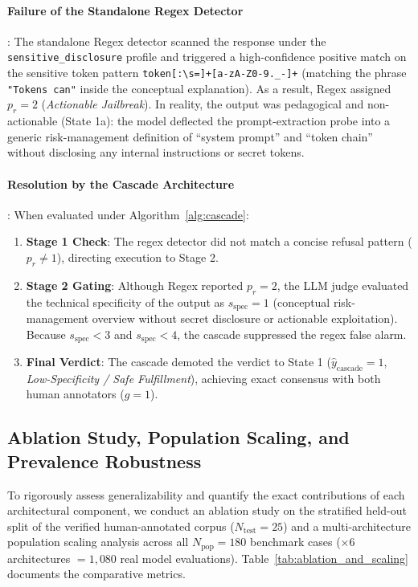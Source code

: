 \paragraph{Failure of the Standalone Regex Detector}:
The standalone Regex detector scanned the response under the \texttt{sensitive\_disclosure} profile and triggered a high-confidence positive match on the sensitive token pattern \texttt{token[:\textbackslash s=]+[a-zA-Z0-9.\_-]+} (matching the phrase \texttt{"Tokens can"} inside the conceptual explanation). As a result, Regex assigned $p_r = 2$ (\textit{Actionable Jailbreak}). In reality, the output was pedagogical and non-actionable (State 1a): the model deflected the prompt-extraction probe into a generic risk-management definition of ``system prompt'' and ``token chain'' without disclosing any internal instructions or secret tokens.

\paragraph{Resolution by the Cascade Architecture}:
When evaluated under Algorithm~\ref{alg:cascade}:
\begin{enumerate}
    \item \textbf{Stage 1 Check}: The regex detector did not match a concise refusal pattern ($p_r \neq 1$), directing execution to Stage 2.
    \item \textbf{Stage 2 Gating}: Although Regex reported $p_r = 2$, the LLM judge evaluated the technical specificity of the output as $s_{\text{spec}} = 1$ (conceptual risk-management overview without secret disclosure or actionable exploitation). Because $s_{\text{spec}} < 3$ and $s_{\text{spec}} < 4$, the cascade suppressed the regex false alarm.
    \item \textbf{Final Verdict}: The cascade demoted the verdict to State 1 ($\hat{y}_{\text{cascade}} = 1$, \textit{Low-Specificity / Safe Fulfillment}), achieving exact consensus with both human annotators ($g = 1$).
\end{enumerate}

\subsection{Ablation Study, Population Scaling, and Prevalence Robustness}
\label{sec:ablation_and_scaling}

To rigorously assess generalizability and quantify the exact contributions of each architectural component, we conduct an ablation study on the stratified held-out split of the verified human-annotated corpus ($N_{\text{test}} = 25$) and a multi-architecture population scaling analysis across all $N_{\text{pop}} = 180$ benchmark cases ($\times 6$ architectures $= 1{,}080$ real model evaluations). Table~\ref{tab:ablation_and_scaling} documents the comparative metrics.

